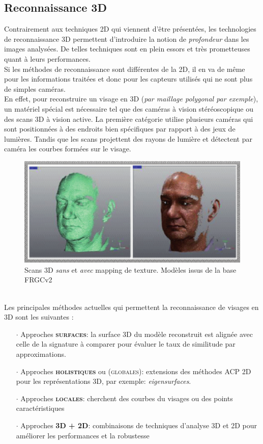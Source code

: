 \subsection{Reconnaissance 3D}
Contrairement aux techniques 2D qui viennent d'être présentées, les technologies de reconnaissance 3D permettent d'introduire la notion de \textit{profondeur} dans les images analysées. De telles techniques sont en plein essors et très prometteuses quant à leurs performances.
\\
Si les méthodes de reconnaissance sont différentes de la 2D, il en va de même pour les informations traitées et donc pour les capteurs utilisés qui ne sont plus de simples caméras. 
\\En effet, pour reconstruire un visage en 3D (\textit{par maillage polygonal par exemple}), un matériel spécial est nécessaire tel que des caméras à vision stéréoscopique ou des scans 3D à vision active. La première catégorie utilise plusieurs caméras qui sont positionnées à des endroits bien spécifiques par rapport à des jeux de lumières. Tandis que les scans projettent des rayons de lumière et détectent par caméra les courbes formées sur le visage.
\begin{figure}[h!]
\center\includegraphics[scale=.35]{images/scans-3D}
\caption{Scans 3D \textit{sans} et \textit{avec} mapping de texture. Modèles issus de la base FRGCv2 \cite{Xphdthesis_4}}
\end{figure}\\
Les principales méthodes actuelles qui permettent la reconnaissance de visages en 3D sont les suivantes \cite{Xphdthesis_4}:
\begin{itemize}\setlength{\itemsep}{.2em}
\item[$\cdot$]Approches \textsc{\textbf{surfaces}}: la surface 3D du modèle reconstruit est alignée avec celle de la signature à comparer pour évaluer le taux de similitude par approximations.
\item[$\cdot$]Approches \textsc{\textbf{holistiques}} ou (\textsc{globales}): extensions des méthodes ACP 2D pour les représentations 3D, par exemple: \textit{eigensurfaces}.
\item[$\cdot$]Approches \textsc{\textbf{locales}}: cherchent des courbes du visages ou des points caractéristiques
\item[$\cdot$]Approches \textsc{\textbf{3D + 2D}}: combinaisons de techniques d'analyse 3D et 2D pour améliorer les performances et la robustesse
\end{itemize}
